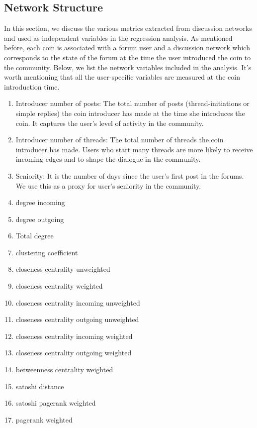 \subsection{Network Structure}
In this section, we discuss the various metrics extracted from discussion networks and used as independent variables in the regression analysis. As mentioned before, each coin is associated with a forum user and a discussion network which corresponds to the state of the forum at the time the user introduced the coin to the community. Below, we list the network variables included in the analysis. It's worth mentioning that all the user-specific variables are measured at the coin introduction time.
\begin{enumerate}
  \item{Introducer number of posts:} The total number of posts (thread-initiations or simple replies) the coin introducer has made at the time she introduces the coin. It captures the user's level of activity in the community.
  \item{Introducer number of threads:} The total number of threads the coin introducer has made. Users who start many threads are more likely to receive incoming edges and to shape the dialogue in the community.
  \item{Seniority:} It is the number of days since the user's first post in the forums. We use this as a proxy for user's seniority in the community.
  \item{degree incoming}
  \item{degree outgoing}
  \item{Total degree}
  \item{clustering coefficient}
  \item{closeness centrality unweighted}
  \item{closeness centrality weighted}
  \item{closeness centrality incoming unweighted}
  \item{closeness centrality outgoing unweighted}
  \item{closeness centrality incoming weighted}
  \item{closeness centrality outgoing weighted}
  \item{betweenness centrality weighted}
  \item{satoshi distance}
  \item{satoshi pagerank weighted}
  \item{pagerank weighted}
\end{enumerate}
